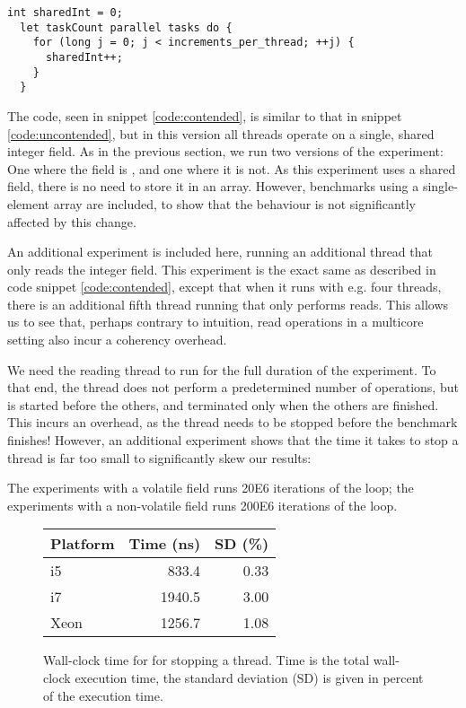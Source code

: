 \begin{code}[hbtp]
\begin{Verbatim}[frame=single]
  int sharedInt = 0;
  let taskCount parallel tasks do {
    for (long j = 0; j < increments_per_thread; ++j) {
      sharedInt++;
    }
  }
\end{Verbatim}
	\caption{Simplified code for the local-field version of the contended-writes
	experiment.}
	\label{code:contended}
\end{code}

The code, seen in snippet \ref{code:contended}, is similar to that in snippet \ref{code:uncontended}, but in this
version all threads operate on a single, shared integer field. As in the previous
section, we run two versions of the experiment: One where the field is
, and one where it is not. As this experiment uses a shared field,
there is no need to store it in an array. However, benchmarks using a
single-element array are included, to show that the behaviour is not
significantly affected by this change.

An additional experiment is included here, running an additional thread that
only reads the integer field. This experiment is the exact same as described in
code snippet \ref{code:contended}, except that when it runs with e.g. four
threads, there is an additional fifth thread running that only performs reads.
This allows us to see that, perhaps contrary to intuition, read operations in a
multicore setting also incur a coherency overhead.

We need the reading thread to run for the full duration of the experiment. To
that end, the thread does not perform a predetermined number of operations, but
is started before the others, and terminated only when the others are
finished. This incurs an overhead, as the thread needs to be stopped before the
benchmark finishes! However, an additional experiment shows that the time it
takes to stop a thread is far too small to significantly skew our results:

The experiments with a volatile field runs 20E6 iterations of the loop;
the experiments with a non-volatile field runs 200E6 iterations of the loop.

\begin{figure}[hbtp]
	\centering
	\begin{tabular}{l r r}
		\hline
		\hline
		Platform & Time (ns) & SD (\%) \\
		\hline
		i5 &  833.4 & 0.33\\
		i7 & 1940.5 & 3.00\\
		Xeon & 1256.7 & 1.08\\
		\hline
		\hline
	\end{tabular}
	\caption{Wall-clock time for for stopping a thread. Time is the total
	wall-clock execution time, the standard deviation (SD) is given in
	percent of the execution time.}
	\label{table:stop-thread}
\end{figure}

